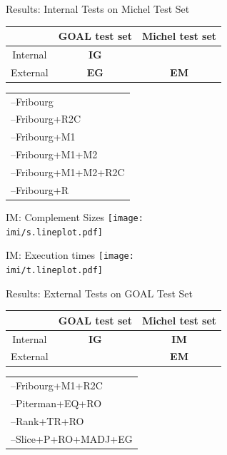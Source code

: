 \documentclass[12pt,handout]{beamer}
\newcommand{\fat}[1]{\textbf{#1}}
\newcommand{\imi}{../results/figures/internal/michel}
\newcommand{\activecell}[1]{\cellcolor{red}\color{white}{#1}}
\newcommand{\myitem}{--\hspace*{\labelsep}}
\newcommand{\imil}{
\begin{tabular}{l}
\myitem Fribourg \\
\myitem Fribourg+R2C \\
\myitem Fribourg+M1 \\
\myitem Fribourg+M1+M2 \\
\myitem Fribourg+M1+M2+R2C \\
\myitem Fribourg+R \\
\end{tabular}}
\newcommand{\egol}{
\begin{tabular}{l}
\myitem Fribourg+M1+R2C \\
\myitem Piterman+EQ+RO \\
\myitem Rank+TR+RO \\
\myitem Slice+P+RO+MADJ+EG \\
\end{tabular}}
\begin{document}
\begin{frame}{Results: Internal Tests on Michel Test Set}
\begin{center}
{\renewcommand{\arraystretch}{1.25}
\begin{tabular}{c|c|c}
         & GOAL test set & Michel test set \\ \hline
Internal & \fat{IG}     & \activecell{\fat{IM}}        \\ \hline
External & \fat{EG}     &             \fat{EM}         \\
\end{tabular}}

\vspace{0.85cm}
\imil
\end{center}
\end{frame}

\begin{frame}{IM: Complement Sizes}
\centering
\texttt{[image: \\imi/s.lineplot.pdf]}
\end{frame}

\begin{frame}{IM: Execution times}
\centering
\texttt{[image: \\imi/t.lineplot.pdf]}
\end{frame}

\begin{frame}{Results: External Tests on GOAL Test Set}
\begin{center}
{\renewcommand{\arraystretch}{1.25}
\begin{tabular}{c|c|c}
         & GOAL test set & Michel test set \\ \hline
Internal & \fat{IG}                  & \fat{IM}        \\ \hline
External & \activecell{\fat{EG}}     & \fat{EM}        \\
\end{tabular}}

\vspace{1.4cm}
\egol
\end{center}
\end{frame}
\end{document}

